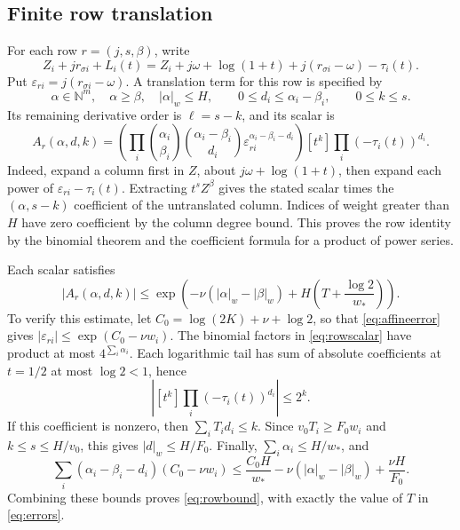 \documentclass[11pt]{article}
\theoremstyle{definition}
\theoremstyle{remark}
\theoremstyle{plain}
\newcommand{\N}{\mathbb N}
\newcommand{\wt}[1]{\lvert #1\rvert_w}
\begin{document}
\subsection{Finite row translation}
For each row \(r=(j,s,\beta)\), write
\[
 Z_i+jr_{\sigma i}+L_i(t)
 =Z_i+j\omega+\log(1+t)
       +j(r_{\sigma i}-\omega)-\tau_i(t).
\]
Put \(\varepsilon_{ri}=j(r_{\sigma i}-\omega)\). A translation term
for this row is specified by
\[
 \alpha\in\N^m,\quad \alpha\ge\beta,\quad \wt\alpha\le H,
 \qquad 0\le d_i\le\alpha_i-\beta_i,\qquad 0\le k\le s.
\]
Its remaining derivative order is \(\ell=s-k\), and its scalar is
\begin{equation}\label{eq:rowscalar}
 A_r(\alpha,d,k)=
 \left(\prod_i\binom{\alpha_i}{\beta_i}
                 \binom{\alpha_i-\beta_i}{d_i}
                 \varepsilon_{ri}^{\alpha_i-\beta_i-d_i}\right)
 [t^k]\prod_i(-\tau_i(t))^{d_i}.
\end{equation}
Indeed, expand a column first in \(Z\), about
\(j\omega+\log(1+t)\), then expand each power of
\(\varepsilon_{ri}-\tau_i(t)\). Extracting \(t^sZ^\beta\) gives
the stated scalar times the \((\alpha,s-k)\) coefficient of the
untranslated column. Indices of weight greater than \(H\) have zero
coefficient by the column degree bound. This proves the row identity
by the binomial theorem and the coefficient formula for a product of
power series.

Each scalar satisfies
\begin{equation}\label{eq:rowbound}
 |A_r(\alpha,d,k)|\le\exp\left(-\nu(\wt\alpha-\wt\beta)
                         +H\left(T+\frac{\log2}{w_*}\right)\right).
\end{equation}
To verify this estimate, let \(C_0=\log(2K)+\nu+\log2\), so that
\eqref{eq:affineerror} gives
\(|\varepsilon_{ri}|\le\exp(C_0-\nu w_i)\). The binomial factors
in \eqref{eq:rowscalar} have product at most \(4^{\sum_i\alpha_i}\).
Each logarithmic tail has sum of absolute coefficients at \(t=1/2\)
at most \(\log2<1\), hence
\[
 \left|[t^k]\prod_i(-\tau_i(t))^{d_i}\right|\le2^k.
\]
If this coefficient is nonzero, then \(\sum_iT_id_i\le k\).
Since \(v_0T_i\ge F_0w_i\) and \(k\le s\le H/v_0\), this gives
\(\wt d\le H/F_0\). Finally,
\(\sum_i\alpha_i\le H/w_*\), and
\[
 \sum_i(\alpha_i-\beta_i-d_i)(C_0-\nu w_i)
 \le \frac{C_0H}{w_*}-\nu(\wt\alpha-\wt\beta)
                              +\frac{\nu H}{F_0}.
\]
Combining these bounds proves \eqref{eq:rowbound}, with exactly the
value of \(T\) in \eqref{eq:errors}.
\end{document}
